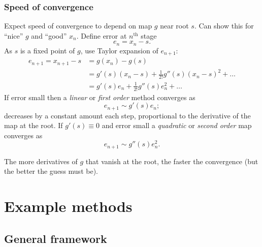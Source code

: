 \documentclass{beamer}
\begin{document}
\begin{frame}
  \frametitle{Speed of convergence}

  \begin{overlayarea}{\textwidth}{0.9\textheight}
    {
      Expect speed of convergence to depend on map $g$ near root $s$. Can show this for ``nice'' $g$ and ``good'' $x_n$.
    }
    {
      Define error at $n^{\text{th}}$ stage
      \begin{equation*}
        e_n = x_n - s.
      \end{equation*}
      As $s$ is a fixed point of $g$, use Taylor expansion of $e_{n+1}$:
      \begin{align*}
        e_{n+1} = x_{n+1} - s & = g(x_n) - g(s) \\
        & = g'(s) (x_n - s) + \tfrac{1}{2!} g''(s) (x_n - s)^2 + \dots \\
        & = g'(s) e_n + \tfrac{1}{2!} g''(s) e_n^2 + \dots
      \end{align*}
    }
    {
      If error small then a \emph{linear} or \emph{first order} method converges as
      \begin{equation*}
        e_{n+1} \sim g'(s) e_n;
      \end{equation*}
      decreases by a constant amount each step, proportional to the derivative of the map at the root.
    }
    {
      If $g'(s) \equiv 0$ and error small a \emph{quadratic} or \emph{second
        order} map converges as
      \begin{equation*}
        e_{n+1} \sim g''(s) e_n^2.
      \end{equation*}
    }
    {

      The more derivatives of $g$ that vanish at the root, the faster
      the convergence (but the better the guess must be).
    }
  \end{overlayarea}

\end{frame}


\section{Example methods}


\subsection{General framework}
\end{document}
